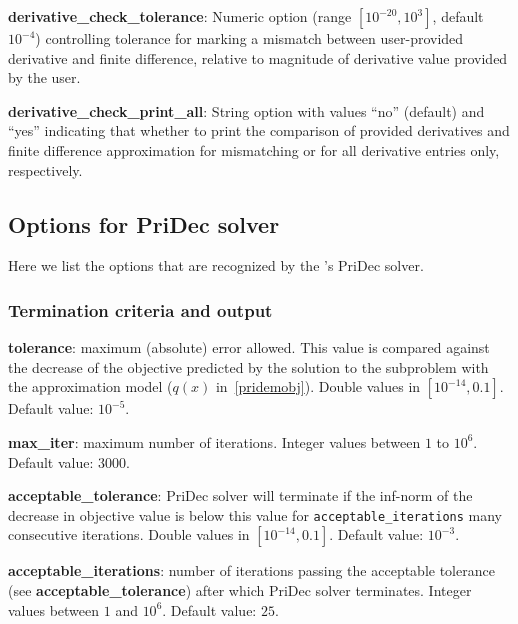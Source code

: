 \noindent \textbf{derivative\_check\_tolerance}: Numeric option (range $[10^{-20}, 10^{3}]$, default $10^{-4}$) controlling tolerance for marking a mismatch between user-provided derivative and finite difference, relative to magnitude of derivative value provided by the user.
\medskip
  
\noindent \textbf{derivative\_check\_print\_all}: String option with values ``no'' (default) and ``yes'' indicating that whether to print the comparison of provided derivatives and finite difference approximation for mismatching or for all derivative entries only, respectively.
    
  
\medskip



















\subsection{Options for PriDec solver}

Here we list the options that are recognized by the \Hi's PriDec solver.
 \subsubsection{Termination criteria and output}

 \noindent \textbf{tolerance}: maximum (absolute) error allowed. This value is compared against the decrease of the objective predicted by the solution to the subproblem with the approximation model ($q(x)$ in~\eqref{pridemobj}). Double values in $[10^{-14},0.1]$. Default value: $10^{-5}$.

  \medskip

  \noindent \textbf{max\_iter}: maximum number of iterations. Integer values between $1$ to $10^6$. Default value: $3000$.
  \medskip
  
  \noindent \textbf{acceptable\_tolerance}: PriDec solver will terminate if the inf-norm of the decrease in objective value is below this value for \texttt{acceptable\_iterations} many consecutive iterations. Double values in $[10^{-14},0.1]$. Default value: $10^{-3}$.

  \medskip

  \noindent \textbf{acceptable\_iterations}: number of iterations passing the acceptable tolerance (see \textbf{acceptable\_tolerance}) after which PriDec solver terminates. Integer values between $1$ and $10^6$. Default value: $25$.

